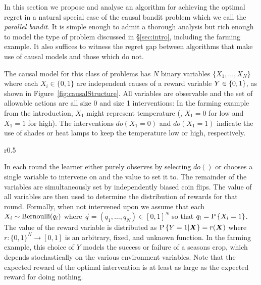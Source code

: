

In this section we propose and analyse an algorithm for achieving the optimal regret in a natural special 
case of the causal bandit problem which we call the {\it parallel bandit}.
It is simple enough to admit a thorough analysis but rich enough to model the type of problem discussed in \S\ref{sec:intro}, including the farming example. 
It also suffices to witness the regret gap between algorithms that make use of causal models and those which do not.

The causal model for this class of problems has $N$ binary variables $\{ X_1, \ldots, X_N \}$ where each $X_i \in \{0,1\}$ are independent causes of a 
reward variable $Y \in \set{0,1}$, as shown in Figure~\ref{fig:causalStructure}.
All variables are observable and the set of allowable actions are all size 0 and size 1 interventions: 
In the farming example from the introduction, $X_1$ might represent temperature (\eg, $X_1=0$ for low and $X_1=1$ for high). 
The interventions $do(X_1 = 0)$ and $do(X_1 = 1)$ indicate the use of shades or heat lamps to keep the temperature low or high, respectively.

\begin{wrapfigure}[11]{r}{0.5\textwidth}
  \begin{center}
  \end{center}
  \caption{Causal model for the parallel bandits problem.\label{fig:causalStructure}}
\end{wrapfigure}

In each round the learner either purely observes by selecting $do()$ or chooses a single variable to intervene on and the value to set it to. 
The remainder of the variables are simultaneously set by independently biased coin flips. 
The value of all variables are then used to determine the distribution of rewards for that round.
Formally, when not intervened upon we assume that each $X_i \sim \bernoulli(q_i)$ where $\vec{q} = (q_1, \ldots, q_N) \in [0,1]^N$ so that $q_i = \P{X_i = 1}$.
The value of the reward variable is distributed as $\P{Y = 1|\vec{X}} = r(\vec{X})$ where 
$r : \{0,1\}^N \to [0,1]$ is an arbitrary, fixed, and unknown function. 
In the farming example, this choice of $Y$ models the success or failure of a seasons crop, which depends stochastically on the various environment variables.
Note that the expected reward of the optimal intervention is at least as large as the expected reward for doing nothing.

